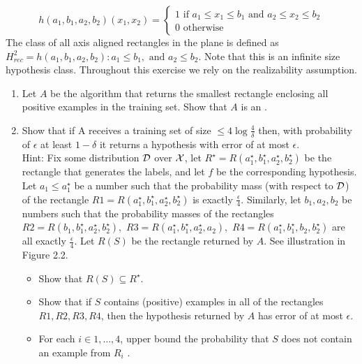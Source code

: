 \documentclass[12pt]{article}
\theoremstyle{definition}
\begin{document}
\begin{enumerate}
\[ h(a_{1},b_{1},a_{2},b_{2})(x_{1},x_{2}) = 
\begin{cases}
1 \text{ if } a_{1} \leq x_{1} \leq b_{1}\text{ and }a_{2} \leq x_{2} \leq b_{2} \\
0 \text{ otherwise}
\end{cases}\]
The class of all axis aligned rectangles in the plane is defined as
$H^{2}_{rec} = {h(a_{1},b_{1},a_{2},b_{2}) : a_{1} \leq b_{1},\text{ and }a_{2} \leq b_{2}}$.
Note that this is an infinite size hypothesis class. 
Throughout this exercise we rely on the realizability assumption.
	\begin{enumerate}
		\item Let $A$ be the algorithm that returns the smallest rectangle enclosing 
		all positive examples in the training set. Show that $A$ is an .
		\item Show that if A receives a training set of size $\leq 4\log{\frac{4}{\delta}}$ then, 
		with probability of $\epsilon$ at least $1 - \delta$ it returns a hypothesis 
		with error of at most $\epsilon$.\\

		Hint: Fix some distribution ${\cal D}$ over ${\cal X}$, let 
		$R^{\star} = R(a_{1}^{\star},b_{1}^{\star},a_{2}^{\star},b_{2}^{\star})$ be the 
		rectangle that generates the labels, and let $f$ be the corresponding hypothesis. 
		Let $a_{1} \leq a_{1}^{\star}$ be a number such that the probability mass 
		(with respect to ${\cal D}$) of the rectangle 
		$R1 = R(a_{1}^{\star},b_{1}^{\star},a_{2}^{\star},b_{2}^{\star})$ is exactly $\frac{\epsilon}{4}$. 
		Similarly, let $b_{1},a_{2},b_{2}$ be numbers such that the probability masses 
		of the rectangles $R2 = R(b_{1},b_{1}^{\star},a_{2}^{\star},b_{2}^{\star}),$
		$R3 = R(a_{1}^{\star},b_{1}^{\star},a_{2}^{\star},a_{2}),$
		$R4 = R(a_{1}^{\star},b_{1}^{\star},b_{2},b_{2}^{\star})$
		are all exactly $\frac{\epsilon}{4}$. Let $R(S)$ be the rectangle returned by $A$. 
		See illustration in Figure 2.2.
		
		\begin{itemize}
			\item Show that $R(S) \subseteq R^{\star}$.

			\item Show that if $S$ contains (positive) examples in all of the rectangles
			$R1, R2, R3, R4$, then the hypothesis returned by $A$ has error of at most $\epsilon$.

			\item For each $i \in {1,\hdots, 4}$, upper bound the probability that $S$ does not 
			contain an example from $R_{i}$ .


\end{itemize}
\end{enumerate}
\end{enumerate}
\end{document}
